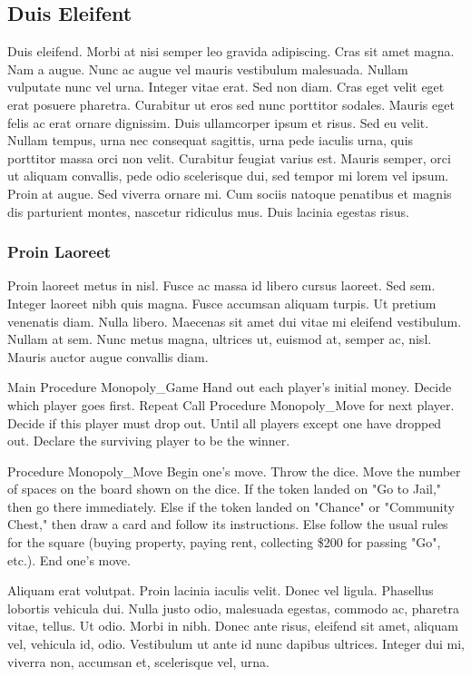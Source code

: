 \subsection{Duis Eleifent}\label{NullaPorta_ClassAptent_DuisEleifent}
Duis eleifend. Morbi at nisi semper leo gravida adipiscing. Cras sit amet magna. Nam a augue. Nunc ac augue vel mauris vestibulum malesuada. Nullam vulputate nunc vel urna. Integer vitae erat. Sed non diam. Cras eget velit eget erat posuere pharetra. Curabitur ut eros sed nunc porttitor sodales. Mauris eget felis ac erat ornare dignissim. Duis ullamcorper ipsum et risus. Sed eu velit. Nullam tempus, urna nec consequat sagittis, urna pede iaculis urna, quis porttitor massa orci non velit. Curabitur feugiat varius est. Mauris semper, orci ut aliquam convallis, pede odio scelerisque dui, sed tempor mi lorem vel ipsum. Proin at augue. Sed viverra ornare mi. Cum sociis natoque penatibus et magnis dis parturient montes, nascetur ridiculus mus. Duis lacinia egestas risus.

\subsubsection{Proin Laoreet}
Proin laoreet metus in nisl. Fusce ac massa id libero cursus laoreet. Sed sem. Integer laoreet nibh quis magna. Fusce accumsan aliquam turpis. Ut pretium venenatis diam. Nulla libero. Maecenas sit amet dui vitae mi eleifend vestibulum. Nullam at sem. Nunc metus magna, ultrices ut, euismod at, semper ac, nisl. Mauris auctor augue convallis diam.

\begin{code}
  Main Procedure Monopoly_Game
    Hand out each player's initial money.
    Decide which player goes first.
    Repeat
      Call Procedure Monopoly_Move for next player.
      Decide if this player must drop out.
    Until all players except one have dropped out.
    Declare the surviving player to be the winner.

  Procedure Monopoly_Move
    Begin one's move.
    Throw the dice.
    Move the number of spaces on the board shown on the dice.
    If the token landed on "Go to Jail,"
      then go there immediately.
    Else if the token landed on "Chance" or "Community Chest,"
      then draw a card and follow its instructions.
    Else
      follow the usual rules for the square (buying property,
      paying rent, collecting \$200 for passing "Go", etc.).
    End one's move.
\end{code}

Aliquam erat volutpat. Proin lacinia iaculis velit. Donec vel ligula. Phasellus lobortis vehicula dui. Nulla justo odio, malesuada egestas, commodo ac, pharetra vitae, tellus. Ut odio. Morbi in nibh. Donec ante risus, eleifend sit amet, aliquam vel, vehicula id, odio. Vestibulum ut ante id nunc dapibus ultrices. Integer dui mi, viverra non, accumsan et, scelerisque vel, urna. 

